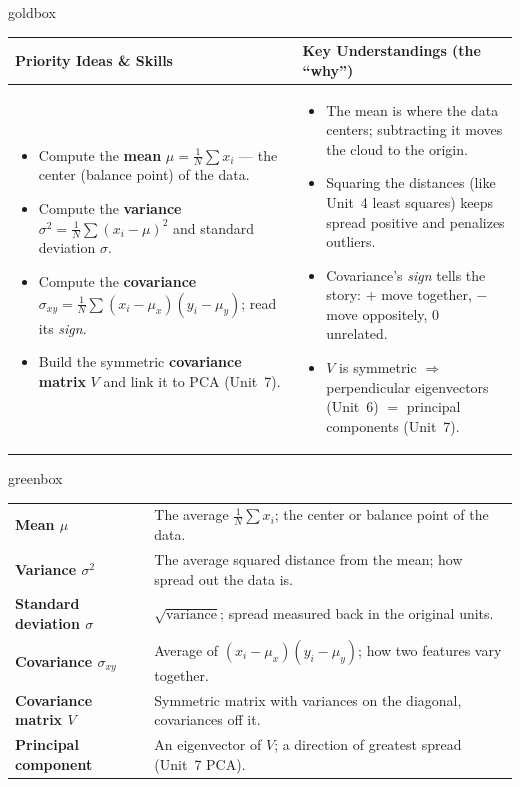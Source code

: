 \documentclass[10pt]{article}
\begin{document}
\renewcommand{\arraystretch}{1.4}
\begin{skillbox}{goldbox}
\begin{tabularx}{\linewidth}{@{}X|X@{}}
\textbf{Priority Ideas \& Skills} & \textbf{Key Understandings (the ``why'')} \\[2pt]
\hline
\vspace{-6pt}
\begin{itemize}[leftmargin=1.1em, nosep, after=\vspace{2pt}]
  \item Compute the \textbf{mean} $\mu=\frac1N\sum x_i$ --- the center (balance point) of the data.
  \item Compute the \textbf{variance} $\sigma^2=\frac1N\sum(x_i-\mu)^2$ and standard deviation $\sigma$.
  \item Compute the \textbf{covariance} $\sigma_{xy}=\frac1N\sum(x_i-\mu_x)(y_i-\mu_y)$; read its \emph{sign}.
  \item Build the symmetric \textbf{covariance matrix} $V$ and link it to PCA (Unit~7).
\end{itemize}
&
\vspace{-6pt}
\begin{itemize}[leftmargin=1.1em, nosep, after=\vspace{2pt}]
  \item The mean is where the data centers; subtracting it moves the cloud to the origin.
  \item Squaring the distances (like Unit~4 least squares) keeps spread positive and penalizes outliers.
  \item Covariance's \emph{sign} tells the story: $+$ move together, $-$ move oppositely, $0$ unrelated.
  \item $V$ is symmetric $\Rightarrow$ perpendicular eigenvectors (Unit~6) $=$ principal components (Unit~7).
\end{itemize}
\end{tabularx}
\end{skillbox}

\begin{skillbox}{greenbox}
\renewcommand{\arraystretch}{1.3}
\begin{tabularx}{\linewidth}{@{}l X@{}}
\textbf{Mean $\mu$} & The average $\frac1N\sum x_i$; the center or balance point of the data. \\
\textbf{Variance $\sigma^2$} & The average squared distance from the mean; how spread out the data is. \\
\textbf{Standard deviation $\sigma$} & $\sqrt{\text{variance}}$; spread measured back in the original units. \\
\textbf{Covariance $\sigma_{xy}$} & Average of $(x_i-\mu_x)(y_i-\mu_y)$; how two features vary together. \\
\textbf{Covariance matrix $V$} & Symmetric matrix with variances on the diagonal, covariances off it. \\
\textbf{Principal component} & An eigenvector of $V$; a direction of greatest spread (Unit~7 PCA). \\
\end{tabularx}
\end{skillbox}
\end{document}
